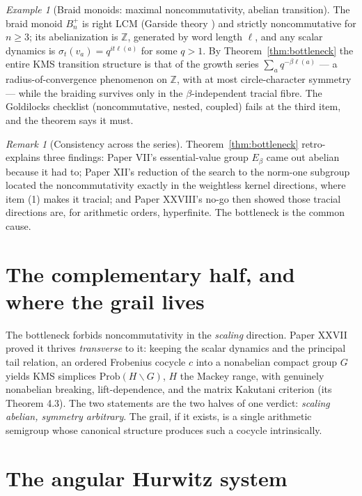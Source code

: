 \documentclass[11pt]{amsart}
\theoremstyle{remark}
\newtheorem{remark}[theorem]{Remark}
\newtheorem{example}[theorem]{Example}
\newcommand{\Z}{\mathbb{Z}}
\newcommand{\Prob}{\mathrm{Prob}}
\begin{document}
\begin{example}[Braid monoids: maximal noncommutativity, abelian transition]\label{ex:braid}
The braid monoid $B_n^+$ is right LCM (Garside theory \cite{Dehornoy}) and strictly
noncommutative for $n\ge3$; its abelianization is $\Z$, generated by word length
$\ell$, and any scalar dynamics is $\sigma_t(v_a)=q^{it\ell(a)}$ for some $q>1$. By
Theorem~\ref{thm:bottleneck} the entire KMS transition structure is that of the growth
series $\sum_aq^{-\beta\ell(a)}$ --- a radius-of-convergence phenomenon on $\Z$, with at
most circle-character symmetry --- while the braiding survives only in the
$\beta$-independent tracial fibre. The Goldilocks checklist (noncommutative, nested,
coupled) fails at the third item, and the theorem says it must.
\end{example}

\begin{remark}[Consistency across the series]\label{rem:consistency}
Theorem~\ref{thm:bottleneck} retro-explains three findings: Paper VII's essential-value
group $E_\beta$ came out abelian because it had to; Paper XII's reduction of the search
to the norm-one subgroup located the noncommutativity exactly in the weightless kernel
directions, where item (1) makes it tracial; and Paper XXVIII's no-go then showed those
tracial directions are, for arithmetic orders, hyperfinite. The bottleneck is the common
cause.
\end{remark}

\section{The complementary half, and where the grail lives}\label{sec:complement}

The bottleneck forbids noncommutativity in the \emph{scaling} direction. Paper XXVII
proved it thrives \emph{transverse} to it: keeping the scalar dynamics and the principal
tail relation, an ordered Frobenius cocycle $c$ into a nonabelian compact group $G$
yields KMS simplices $\Prob(H\backslash G)$, $H$ the Mackey range, with genuinely
nonabelian breaking, lift-dependence, and the matrix Kakutani criterion (its Theorem
4.3). The two statements are the two halves of one verdict: \emph{scaling abelian,
symmetry arbitrary}. The grail, if it exists, is a single arithmetic semigroup whose
canonical structure produces such a cocycle intrinsically.

\section{The angular Hurwitz system}\label{sec:angular}
\end{document}
